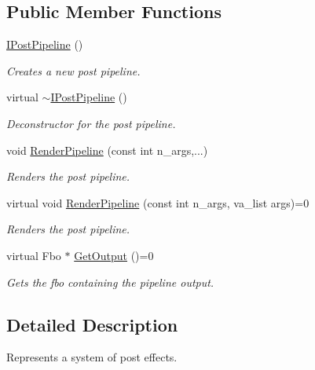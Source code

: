 \subsection*{Public Member Functions}
\begin{DoxyCompactItemize}
\item 
\hyperlink{class_flounder_1_1_i_post_pipeline_ac202f7f32a75002597502b192f557b2f}{I\+Post\+Pipeline} ()
\begin{DoxyCompactList}\small\item\em Creates a new post pipeline. \end{DoxyCompactList}\item 
virtual \hyperlink{class_flounder_1_1_i_post_pipeline_ad244c35f51f5f355ee7f8be9a3801ca0}{$\sim$\+I\+Post\+Pipeline} ()
\begin{DoxyCompactList}\small\item\em Deconstructor for the post pipeline. \end{DoxyCompactList}\item 
void \hyperlink{class_flounder_1_1_i_post_pipeline_a6a36137fbabb88ee24c274d1a523a24b}{Render\+Pipeline} (const int n\+\_\+args,...)
\begin{DoxyCompactList}\small\item\em Renders the post pipeline. \end{DoxyCompactList}\item 
virtual void \hyperlink{class_flounder_1_1_i_post_pipeline_ad5388fe41486385c55896bdd9439bf60}{Render\+Pipeline} (const int n\+\_\+args, va\+\_\+list args)=0
\begin{DoxyCompactList}\small\item\em Renders the post pipeline. \end{DoxyCompactList}\item 
virtual Fbo $\ast$ \hyperlink{class_flounder_1_1_i_post_pipeline_a3953881189f3c7876ce4bb5e88f1796c}{Get\+Output} ()=0
\begin{DoxyCompactList}\small\item\em Gets the fbo containing the pipeline output. \end{DoxyCompactList}\end{DoxyCompactItemize}


\subsection{Detailed Description}
Represents a system of post effects. 




